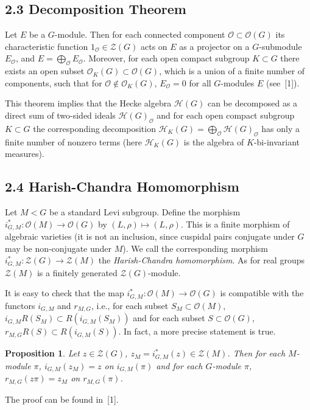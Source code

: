 \documentclass[12pt,a4paper]{article}
\theoremstyle{plain}
\newtheorem{proposition}{Proposition}
\theoremstyle{definition}
\theoremstyle{remark}
\newcommand{\cH}{\mathscr{H}}
\newcommand{\cO}{\mathcal{O}}
\newcommand{\cZ}{\mathcal{Z}}
\begin{document}
\subsection*{2.3 Decomposition Theorem}

Let $E$ be a $G$-module. Then for each connected component $\cO \subset \cO(G)$ its characteristic function $1_{\cO} \in \cZ(G)$ acts on $E$ as a projector on a $G$-submodule $E_{\cO}$, and $E = \bigoplus_{\cO} E_{\cO}$. Moreover, for each open compact subgroup $K \subset G$ there exists an open subset $\cO_K(G) \subset \cO(G)$, which is a union of a finite number of components, such that for $\cO \notin \cO_K(G)$, $E_{\cO} = 0$ for all $G$-modules $E$ (see~[1]).

This theorem implies that the Hecke algebra $\cH(G)$ can be decomposed as a direct sum of two-sided ideals $\cH(G)_{\cO}$ and for each open compact subgroup $K \subset G$ the corresponding decomposition $\cH_K(G) = \bigoplus_{\cO} \cH(G)_{\cO}$ has only a finite number of nonzero terms (here $\cH_K(G)$ is the algebra of $K$-bi-invariant measures).

\subsection*{2.4 Harish-Chandra Homomorphism}

Let $M < G$ be a standard Levi subgroup. Define the morphism $i_{G,M}^*: \cO(M) \to \cO(G)$ by $(L, \rho) \mapsto (L, \rho)$. This is a finite morphism of algebraic varieties (it is not an inclusion, since cuspidal pairs conjugate under $G$ may be non-conjugate under $M$). We call the corresponding morphism $i_{G,M}^*: \cZ(G) \to \cZ(M)$ the \emph{Harish-Chandra homomorphism}. As for real groups $\cZ(M)$ is a finitely generated $\cZ(G)$-module.

It is easy to check that the map $i_{G,M}^*: \cO(M) \to \cO(G)$ is compatible with the functors $i_{G,M}$ and $r_{M,G}$, i.e., for each subset $S_M \subset \cO(M)$, $i_{G,M} R(S_M) \subset R(i_{G,M}(S_M))$ and for each subset $S \subset \cO(G)$, $r_{M,G} R(S) \subset R(i_{G,M}(S))$. In fact, a more precise statement is true.

\begin{proposition}
Let $z \in \cZ(G)$, $z_M = i_{G,M}^*(z) \in \cZ(M)$. Then for each $M$-module $\pi$, $i_{G,M}(z_M) = z$ on $i_{G,M}(\pi)$ and for each $G$-module $\pi$, $r_{M,G}(z\pi) = z_M$ on $r_{M,G}(\pi)$.
\end{proposition}

The proof can be found in~[1].
\end{document}
